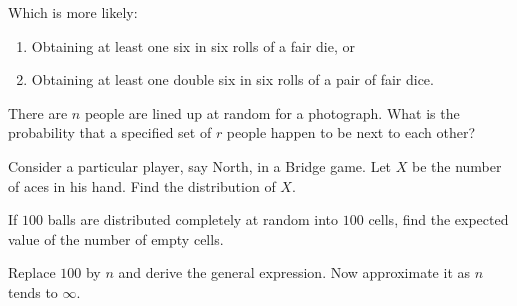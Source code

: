 \begin{problem}[Handout 1, \# 12]
  Which is more likely:
  \begin{enumerate}[label=(\alph*),noitemsep]
  \item Obtaining at least one six in six rolls of a fair die, or
  \item Obtaining at least one double six in six rolls of a pair of fair
    dice.
  \end{enumerate}
\end{problem}
\begin{solution}
\end{solution}

\begin{problem}[Handout 1, \# 13]
  There are \(n\) people are lined up at random for a photograph. What is
  the probability that a specified set of \(r\) people happen to be next to
  each other?
\end{problem}
\begin{solution}
\end{solution}

\begin{problem}[Handout 1, \# 16]
  Consider a particular player, say North, in a Bridge game. Let \(X\) be
  the number of aces in his hand. Find the distribution of \(X\).
\end{problem}
\begin{solution}
\end{solution}

\begin{problem}[Handout 1, \# 20]
  If \(100\) balls are distributed completely at random into \(100\) cells,
  find the expected value of the number of empty cells.

  \noindent Replace \(100\) by \(n\) and derive the general expression. Now
  approximate it as \(n\) tends to \(\infty\).
\end{problem}
\begin{solution}
\end{solution}

